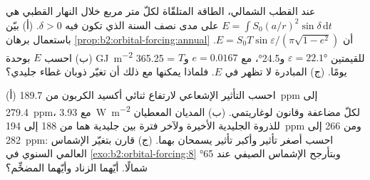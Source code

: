 \begin{exercise}[$\star\star\star$]\label{exo:b2:orbital-forcing:11}
عند القطب الشمالي، الطاقة المتلقّاة لكلّ متر مربع خلال النهار القطبي هي $E = \int S_0(a/r)^2
\sin\delta\,\mathrm dt$ على مدى نصف السنة الذي تكون فيه $\delta > 0$. (أ) بيّن باستعمال برهان
\cref{prop:b2:orbital-forcing:annual} أن $E = S_0T\sin\varepsilon/(\pi\sqrt{1 - e^2})$. (ب) احسب
$E$ بوحدة \unit{GJ.m^{-2}} للقيمتين $\varepsilon = \ang{22.1}$ و\ang{24.5}، مع $e = 0.0167$ و$T$ =
365.25 يومًا. (ج) المبادرة لا تظهر في $E$. فلماذا يمكنها مع ذلك أن تغيّر
ذوبان غطاء جليدي؟
\end{exercise}

\begin{exercise}[$\star\star\star$]\label{exo:b2:orbital-forcing:12}
(أ) احسب التأثير الإشعاعي لارتفاع ثنائي أكسيد الكربون من \qty{189.7}{ppm} إلى
\qty{279.4}{ppm}، مع \qty{3.93}{W.m^{-2}} لكلّ مضاعفة وقانون لوغاريتمي. (ب) المديان
المعطيان للذروة الجليدية الأخيرة ولآخر فترة بين جليدية هما من 188 إلى \qty{194}{ppm} ومن 266 إلى
\qty{282}{ppm}: احسب أصغر تأثير وأكبر تأثير يسمحان بهما. (ج) قارن بتغيّر
الإشماس العالمي السنوي في \cref{exo:b2:orbital-forcing:8} وبتأرجح
الإشماس الصيفي عند \ang{65} شمالًا. أيّهما الزناد وأيّهما المضخِّم؟
\end{exercise}

